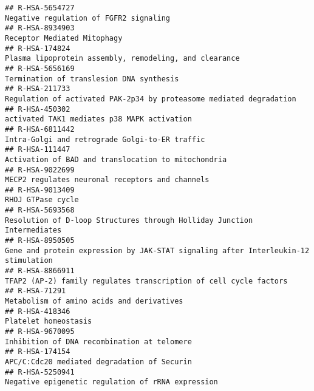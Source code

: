 \documentclass[
]{article}
\begin{document}
\begin{verbatim}
## R-HSA-5654727                                                                                               Negative regulation of FGFR2 signaling
## R-HSA-8934903                                                                                                          Receptor Mediated Mitophagy
## R-HSA-174824                                                                                Plasma lipoprotein assembly, remodeling, and clearance
## R-HSA-5656169                                                                                             Termination of translesion DNA synthesis
## R-HSA-211733                                                                   Regulation of activated PAK-2p34 by proteasome mediated degradation
## R-HSA-450302                                                                                           activated TAK1 mediates p38 MAPK activation
## R-HSA-6811442                                                                                       Intra-Golgi and retrograde Golgi-to-ER traffic
## R-HSA-111447                                                                                  Activation of BAD and translocation to mitochondria 
## R-HSA-9022699                                                                                      MECP2 regulates neuronal receptors and channels
## R-HSA-9013409                                                                                                                    RHOJ GTPase cycle
## R-HSA-5693568                                                              Resolution of D-loop Structures through Holliday Junction Intermediates
## R-HSA-8950505                                                   Gene and protein expression by JAK-STAT signaling after Interleukin-12 stimulation
## R-HSA-8866911                                                                    TFAP2 (AP-2) family regulates transcription of cell cycle factors
## R-HSA-71291                                                                                              Metabolism of amino acids and derivatives
## R-HSA-418346                                                                                                                  Platelet homeostasis
## R-HSA-9670095                                                                                          Inhibition of DNA recombination at telomere
## R-HSA-174154                                                                                           APC/C:Cdc20 mediated degradation of Securin
## R-HSA-5250941                                                                                    Negative epigenetic regulation of rRNA expression

\end{verbatim}
\end{document}

